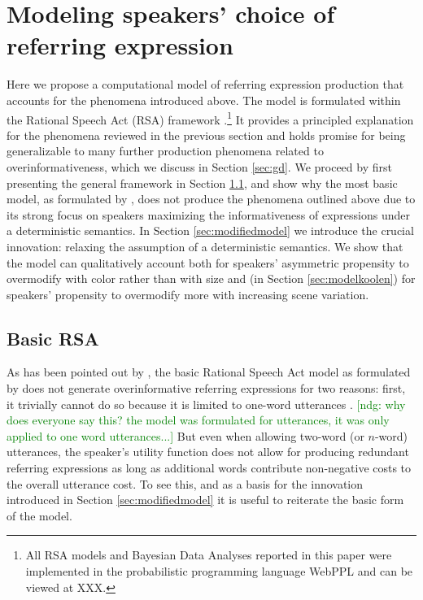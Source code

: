 \documentclass[11pt]{article}
\newcommand{\ndg}[1]{\textcolor{Green}{[ndg: #1]}}
\newcommand{\sectionref}[1]{Section \ref{#1}}
\begin{document}
\section{Modeling speakers' choice of referring expression}
\label{sec:models}

Here we propose a computational model of referring expression production that accounts for the phenomena introduced above. The model is formulated within the Rational Speech Act (RSA) framework \cite{frank2012, goodman2016}.\footnote{All RSA models and Bayesian Data Analyses reported in this paper were implemented in the probabilistic programming language WebPPL \cite{GoodmanStuhlmuller14_DIPPL} and can be viewed at XXX.} It provides a principled explanation for the phenomena reviewed in the previous section and  holds promise for being generalizable to many further production phenomena related to overinformativeness, which we discuss in \sectionref{sec:gd}. We proceed by first presenting the general framework in \sectionref{sec:basicrsa}, and show why the most basic model, as formulated by , does not produce the phenomena outlined above due to its strong focus on speakers maximizing the informativeness of expressions under a deterministic semantics. In \sectionref{sec:modifiedmodel} we introduce the crucial innovation: relaxing the assumption of a deterministic semantics. We show that the model can qualitatively account both for speakers' asymmetric propensity to overmodify with color rather than with size and (in \sectionref{sec:modelkoolen}) for speakers' propensity to overmodify more with increasing scene variation. 


\subsection{Basic RSA}
\label{sec:basicrsa}

As has been pointed out by , the basic Rational Speech Act model as formulated by  does not generate overinformative referring expressions for two reasons: first, it trivially cannot do so because it is limited to one-word utterances \cite<see also>{Baumann2014}. 
\ndg{why does everyone say this? the model was formulated for utterances, it was only applied to one word utterances...}
But even when allowing two-word (or $n$-word) utterances, the speaker's utility function does not allow for producing redundant referring expressions as long as additional words contribute non-negative costs to the overall utterance cost. To see this, and as a basis for the innovation introduced in \sectionref{sec:modifiedmodel} it is useful to reiterate the basic form of the model.
\end{document}

